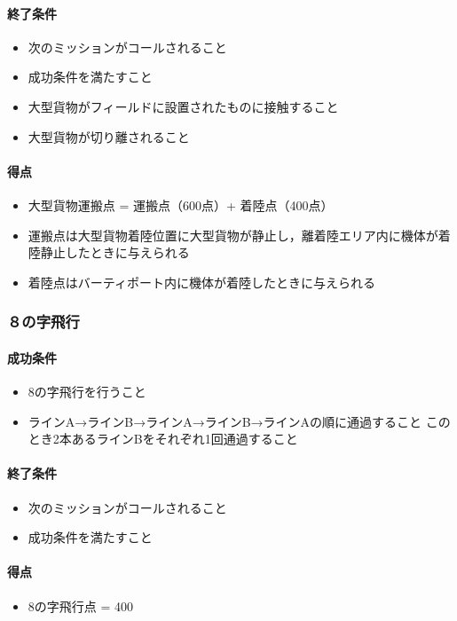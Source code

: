 \paragraph{終了条件}
\begin{itemize}
  \item 次のミッションがコールされること
  \item 成功条件を満たすこと
  \item 大型貨物がフィールドに設置されたものに接触すること
  \item 大型貨物が切り離されること
\end{itemize}
\paragraph{得点}
\begin{itemize}
  \item 大型貨物運搬点 = 運搬点（600点）+ 着陸点（400点）
  \item 運搬点は大型貨物着陸位置に大型貨物が静止し，離着陸エリア内に機体が着陸静止したときに与えられる
  \item 着陸点はバーティポート内に機体が着陸したときに与えられる
\end{itemize}

\subsubsection{８の字飛行}
\paragraph{成功条件}
\begin{itemize}
\item 8の字飛行を行うこと
\item ラインA→ラインB→ラインA→ラインB→ラインAの順に通過すること\newline
このとき2本あるラインBをそれぞれ1回通過すること
\end{itemize}
\paragraph{終了条件}
\begin{itemize}
\item 次のミッションがコールされること
\item 成功条件を満たすこと
\end{itemize}
\paragraph{得点}
\begin{itemize}
\item 8の字飛行点 = 400
\end{itemize}

